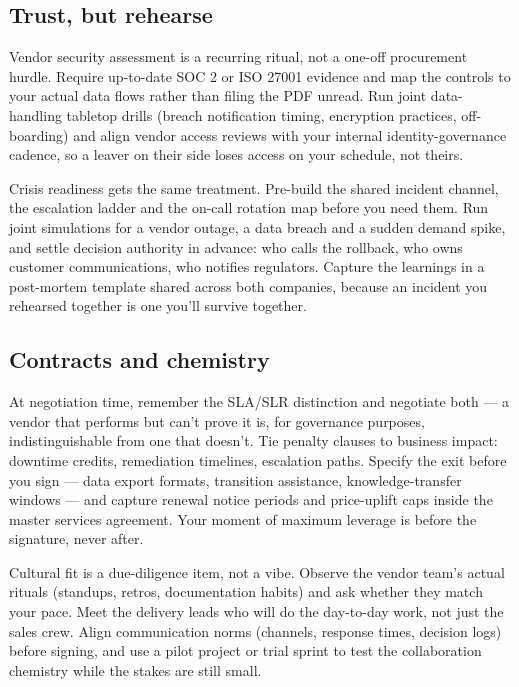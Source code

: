 \subsection{Trust, but rehearse}


Vendor security assessment is a recurring ritual, not a one-off procurement hurdle. Require up-to-date SOC 2 or ISO 27001 evidence and map the controls to your actual data flows rather than filing the PDF unread. Run joint data-handling tabletop drills (breach notification timing, encryption practices, off-boarding) and align vendor access reviews with your internal identity-governance cadence, so a leaver on their side loses access on your schedule, not theirs.


Crisis readiness gets the same treatment. Pre-build the shared incident channel, the escalation ladder and the on-call rotation map before you need them. Run joint simulations for a vendor outage, a data breach and a sudden demand spike, and settle decision authority in advance: who calls the rollback, who owns customer communications, who notifies regulators. Capture the learnings in a post-mortem template shared across both companies, because an incident you rehearsed together is one you'll survive together.



\subsection{Contracts and chemistry}


At negotiation time, remember the SLA/SLR distinction and negotiate both — a vendor that performs but can't prove it is, for governance purposes, indistinguishable from one that doesn't. Tie penalty clauses to business impact: downtime credits, remediation timelines, escalation paths. Specify the exit before you sign — data export formats, transition assistance, knowledge-transfer windows — and capture renewal notice periods and price-uplift caps inside the master services agreement. Your moment of maximum leverage is before the signature, never after.


Cultural fit is a due-diligence item, not a vibe. Observe the vendor team's actual rituals (standups, retros, documentation habits) and ask whether they match your pace. Meet the delivery leads who will do the day-to-day work, not just the sales crew. Align communication norms (channels, response times, decision logs) before signing, and use a pilot project or trial sprint to test the collaboration chemistry while the stakes are still small.



